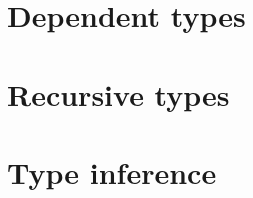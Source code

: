 \documentclass[ebook,oneside]{memoir} %
\begin{document}
      \chapter{Dependent types}

      \chapter{Recursive types}

      \chapter{Type inference}


  \backmatter


    \printbibliography[heading=bibintoc,title=References]

    \printindex
\end{document}
